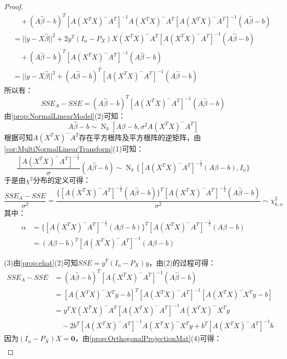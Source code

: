 \begin{proof}
\begin{align*}
		&\quad+(A\hat{\beta}-b)^T[A(X^TX)^-A^T]^{-1}A(X^TX)^-A^T[A(X^TX)^-A^T]^{-1}(A\hat{\beta}-b) \\
		&=||y-X\hat{\beta}||^2+2y^T(I_n-P_X)X(X^TX)^-A^T[A(X^TX)^-A^T]^{-1}(A\hat{\beta}-b) \\
		&\quad+(A\hat{\beta}-b)^T[A(X^TX)^-A^T]^{-1}(A\hat{\beta}-b) \\
		&=||y-X\hat{\beta}||^2+(A\hat{\beta}-b)^T[A(X^TX)^-A^T]^{-1}(A\hat{\beta}-b)
	\end{align*}
	所以有：
	\begin{equation*}
		SSE_A-SSE=(A\hat{\beta}-b)^T[A(X^TX)^-A^T]^{-1}(A\hat{\beta}-b)
	\end{equation*}
	由\cref{prop:NormalLinearModel}(2)可知：
	\begin{equation*}
		A\hat{\beta}-b\sim\operatorname{N}_k[A\beta-b,\sigma^2A(X^TX)^-A^T]
	\end{equation*}
	根据可知$A(X^TX)^-A^T$存在平方根阵及平方根阵的逆矩阵，由\cref{cor:MultiNormalLinearTransform}(1)可知：
	\begin{equation*}
		\frac{[A(X^TX)^-A^T]^{-\frac{1}{2}}}{\sigma}(A\hat{\beta}-b)\sim\operatorname{N}_k\{[A(X^TX)^-A^T]^{-\frac{1}{2}}(A\beta-b),I_n\}
	\end{equation*}
	于是由$\chi^2$分布的定义可得：
	\begin{equation*}
		\frac{SSE_A-SSE}{\sigma^2}=\frac{\{[A(X^TX)^-A^T]^{-\frac{1}{2}}(A\hat{\beta}-b)\}^T[A(X^TX)^-A^T]^{-\frac{1}{2}}(A\hat{\beta}-b)}{\sigma^2}\sim\chi_{k,\alpha}^2
	\end{equation*}
	其中：
	\begin{align*}
		\alpha&=\{[A(X^TX)^-A^T]^{-\frac{1}{2}}(A\beta-b)\}^T[A(X^TX)^-A^T]^{-\frac{1}{2}}(A\beta-b) \\
		&=(A\beta-b)^T[A(X^TX)^-A^T]^{-1}(A\beta-b)
	\end{align*}\par
	(3)由\cref{prop:ehat}(2)可知$SSE=y^T(I_n-P_X)y$，由(2)的过程可得：
	\begin{align*}
		SSE_A-SSE&=(A\hat{\beta}-b)^T[A(X^TX)^-A^T]^{-1}(A\hat{\beta}-b) \\
		&=[A(X^TX)^-X^Ty-b]^T[A(X^TX)^-A^T]^{-1}[A(X^TX)^-X^Ty-b] \\
		&=y^TX(X^TX)^-A^T[A(X^TX)^-A^T]^{-1}A(X^TX)^-X^Ty \\
		&\quad-2b^T[A(X^TX)^-A^T]^{-1}A(X^TX)^-X^Ty+b^T[A(X^TX)^-A^T]^{-1}b
	\end{align*}
	因为$(I_n-P_X)X=\mathbf{0}$，由\cref{prop:OrthogonalProjectionMat}(4)可得：
	\begin{gather*}

\end{gather*}
\end{proof}
